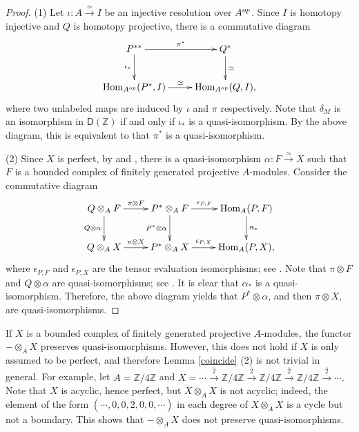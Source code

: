 \documentclass{amsart}
\newcommand{\Z}{\mathbb{Z}}
\newcommand{\D}{\mathsf{D}}
\newcommand{\0}{{\bf{0}}}
\DeclareMathOperator{\Hom}{Hom}
\theoremstyle{definition}
\begin{document}
\begin{proof}
(1) Let $\iota\colon A\xrightarrow \simeq I$ be an injective resolution over $A^{\rm op}$. Since $I$ is homotopy injective and $Q$ is homotopy projective, there is a commutative diagram
$$
\xymatrix{
P^{\ast\ast}\ar[r]^-{\pi^\ast}\ar[d]_-{\iota_\ast}& Q^\ast\ar[d]^-\simeq\\
\Hom_{A^{\rm op}}(P^\ast,I)\ar[r]^-\simeq & \Hom_{A^{\rm op}}(Q,I),
}
$$
where two unlabeled maps are induced by $\iota$ and $\pi$ respectively. Note that $\delta_M$ is an isomorphism in $\D(\Z)$ if and only if $\iota_\ast$ is a quasi-isomorphism. By the above diagram, this is equivalent to that $\pi^\ast$ is a quasi-isomorphism.

(2)
Since $X$ is perfect, by \cite[Theorem 5.1.14]{CFH} and  \cite[Lemma 1.2.1]{Buc}, there is a quasi-isomorphism $\alpha \colon F\xrightarrow \simeq X$  such that $F$ is a bounded complex of finitely generated projective  $A$-modules.
Consider the commutative diagram
$$
\xymatrix{
Q\otimes_A F\ar[r]^-{\pi\otimes F}\ar[d]_-{Q\otimes \alpha}& P^\ast\otimes_A F\ar[r]^-{\epsilon_{P,F}} \ar[d]_-{P^\ast\otimes \alpha} & \Hom_A(P,F)\ar[d]^-{\alpha_\ast}\\
Q\otimes_A X\ar[r]^-{\pi\otimes X} & P^\ast \otimes_A X\ar[r]^-{\epsilon_{P,X}}& \Hom_A(P,X),
}
$$
where $\epsilon_{P, F}$ and $\epsilon_{P,X}$ are the tensor evaluation isomorphisms; see \cite[Theorem 4.5.10]{CFH}.
Note that $\pi\otimes F$ and $Q\otimes \alpha$ are quasi-isomorphisms; see \cite[Proposition 5.8]{Spa}.  It is clear that $\alpha_\ast$ is a quasi-isomorphism. Therefore, the above diagram yields that $P^\ast\otimes \alpha$, and then $\pi\otimes X$, are quasi-isomorphisms.
\end{proof}

If $X$ is a bounded complex of finitely generated projective  $A$-modules,  the functor $-\otimes_A X$ preserves quasi-isomorphisms. However, this does not hold if $X$ is only assumed to be perfect, and therefore Lemma \ref{coincide} (2) is not trivial in general. For example, let $A=\mathbb Z/4\mathbb Z$ and $X=\cdots\xrightarrow {\overline{2}}  \mathbb Z/4\mathbb Z\xrightarrow {\overline{2}}   \mathbb Z/4\mathbb Z  \xrightarrow {\overline{2}}   \mathbb Z/4\mathbb Z \xrightarrow {\overline{2}}\cdots.$ Note that $X$ is acyclic, hence perfect, but $X\otimes_A X$ is not acyclic; indeed, the element of the form $(\cdots, 0,0, \overline{2},0,0,\cdots)$ in each degree of $X\otimes_A X$ is a cycle but not a boundary. This shows that $-\otimes_A X$ does not preserve quasi-isomorphisms.
\end{document}
